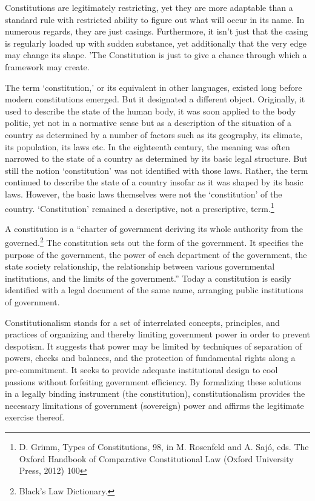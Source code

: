\begin{multicols}{2}
\noi
Constitutions are legitimately restricting, yet they are more adaptable than a standard rule
with restricted ability to figure out what will occur in its name. In numerous regards, they are
just casings. Furthermore, it isn't just that the casing is regularly loaded up with sudden
substance, yet additionally that the very edge may change its shape. 'The Constitution is just
to give a chance through which a framework may create.


\noi
The term ‘constitution,’ or its equivalent in other languages, existed long before modern
constitutions emerged. But it designated a different object. Originally, it used to describe the
state of the human body, it was soon applied to the body politic, yet not in a normative sense
but as a description of the situation of a country as determined by a number of factors such as
its geography, its climate, its population, its laws etc. In the eighteenth century, the meaning
was often narrowed to the state of a country as determined by its basic legal structure. But
still the notion ‘constitution’ was not identified with those laws. Rather, the term continued to
describe the state of a country insofar as it was shaped by its basic laws. However, the basic
laws themselves were not the ‘constitution’ of the country. ‘Constitution’ remained a
descriptive, not a prescriptive, term.\footnote{D. Grimm, Types of Constitutions, 98, in M. Rosenfeld and A. Sajó, eds. The Oxford Handbook of Comparative Constitutional Law (Oxford University Press, 2012) 100}

\noi
A constitution is a “charter of government deriving its whole authority from the governed.\footnote{Black’s Law Dictionary.} The constitution sets out the form of the government. It specifies the purpose of the
government, the power of each department of the government, the state society relationship,
the relationship between various governmental institutions, and the limits of the
government.” Today a constitution is easily identified with a legal document of the same
name, arranging public institutions of government.

\vspace{-.1cm}

\noi
Constitutionalism stands for a set of interrelated concepts, principles, and practices of
organizing and thereby limiting government power in order to prevent despotism. It suggests
that power may be limited by techniques of separation of powers, checks and balances, and
the protection of fundamental rights along a pre-commitment. It seeks to provide adequate
institutional design to cool passions without forfeiting government efficiency. By formalizing
these solutions in a legally binding instrument (the constitution), constitutionalism provides
the necessary limitations of government (sovereign) power and affirms the legitimate
exercise thereof.


\end{multicols}
